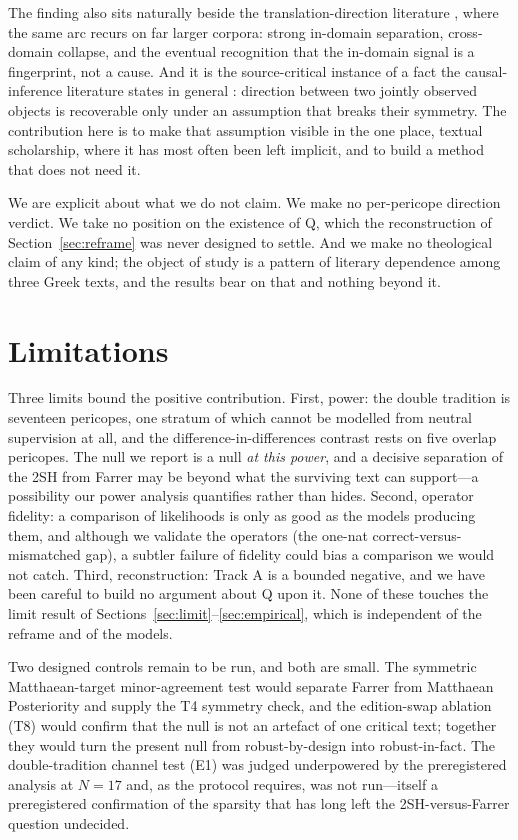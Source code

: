 \documentclass[11pt,letterpaper]{article}
\begin{document}
The finding also sits naturally beside the translation-direction literature \citep{rabinovich2015,sominsky2019}, where the same arc recurs on far larger corpora: strong in-domain separation, cross-domain collapse, and the eventual recognition that the in-domain signal is a fingerprint, not a cause. And it is the source-critical instance of a fact the causal-inference literature states in general \citep{janzing2010,peters2017}: direction between two jointly observed objects is recoverable only under an assumption that breaks their symmetry. The contribution here is to make that assumption visible in the one place, textual scholarship, where it has most often been left implicit, and to build a method that does not need it.

We are explicit about what we do not claim. We make no per-pericope direction verdict. We take no position on the existence of Q, which the reconstruction of Section~\ref{sec:reframe} was never designed to settle. And we make no theological claim of any kind; the object of study is a pattern of literary dependence among three Greek texts, and the results bear on that and nothing beyond it.

\section{Limitations}
\label{sec:limitations}

Three limits bound the positive contribution. First, power: the double tradition is seventeen pericopes, one stratum of which cannot be modelled from neutral supervision at all, and the difference-in-differences contrast rests on five overlap pericopes. The null we report is a null \emph{at this power}, and a decisive separation of the 2SH from Farrer may be beyond what the surviving text can support---a possibility our power analysis quantifies rather than hides. Second, operator fidelity: a comparison of likelihoods is only as good as the models producing them, and although we validate the operators (the one-nat correct-versus-mismatched gap), a subtler failure of fidelity could bias a comparison we would not catch. Third, reconstruction: Track A is a bounded negative, and we have been careful to build no argument about Q upon it. None of these touches the limit result of Sections~\ref{sec:limit}--\ref{sec:empirical}, which is independent of the reframe and of the models.

Two designed controls remain to be run, and both are small. The symmetric Matthaean-target minor-agreement test would separate Farrer from Matthaean Posteriority and supply the T4 symmetry check, and the edition-swap ablation (T8) would confirm that the null is not an artefact of one critical text; together they would turn the present null from robust-by-design into robust-in-fact. The double-tradition channel test (E1) was judged underpowered by the preregistered analysis at $N=17$ and, as the protocol requires, was not run---itself a preregistered confirmation of the sparsity that has long left the 2SH-versus-Farrer question undecided.
\end{document}
